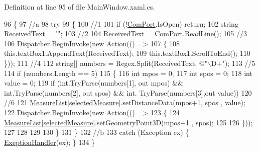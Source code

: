 Definition at line 95 of file Main\+Window.\+xaml.\+cs.


\begin{DoxyCode}
96         \{
97             \textcolor{comment}{//a}
98             \textcolor{keywordflow}{try}
99             \{
100                 \textcolor{comment}{//1}
101                 \textcolor{keywordflow}{if} (!\hyperlink{class_l_i_d_a_r___controller_1_1_main_window_ae8b01d789601ddbc234ede8a0b43eb7b}{ComPort}.IsOpen) \textcolor{keywordflow}{return};
102                 \textcolor{keywordtype}{string} ReceivedText = \textcolor{stringliteral}{""};
103                 \textcolor{comment}{//2}
104                 ReceivedText = \hyperlink{class_l_i_d_a_r___controller_1_1_main_window_ae8b01d789601ddbc234ede8a0b43eb7b}{ComPort}.ReadLine();
105                 \textcolor{comment}{//3}
106                 Dispatcher.BeginInvoke(\textcolor{keyword}{new} Action(() =>
107                 \{
108                     this.textBox1.AppendText(ReceivedText);
109                     this.textBox1.ScrollToEnd();
110                 \}));
111                 \textcolor{comment}{//4}
112                 \textcolor{keywordtype}{string}[] numbers = Regex.Split(ReceivedText, \textcolor{stringliteral}{@"\(\backslash\)D+"});
113                 \textcolor{comment}{//5}
114                 \textcolor{keywordflow}{if} (numbers.Length == 5)
115                 \{
116                     \textcolor{keywordtype}{int} mpos = 0;
117                     \textcolor{keywordtype}{int} spos = 0;
118                     \textcolor{keywordtype}{int} value = 0;
119                     \textcolor{keywordflow}{if} (\textcolor{keywordtype}{int}.TryParse(numbers[1], out mpos) && \textcolor{keywordtype}{int}.TryParse(numbers[2], out spos) && \textcolor{keywordtype}{int}.
      TryParse(numbers[3],out value))
120                         \textcolor{comment}{//6}
121                         \hyperlink{class_l_i_d_a_r___controller_1_1_main_window_add7555b1a79fa1c17cd18dcf98859b9c}{MeasureList}[\hyperlink{class_l_i_d_a_r___controller_1_1_main_window_a01f677b33ad15d2f0cdf8df1c64cd0e2}{selectedMeasure}].setDistanceData(mpos+1, spos
      , value);
122                     Dispatcher.BeginInvoke(\textcolor{keyword}{new} Action(() =>
123                     \{
124                         \hyperlink{class_l_i_d_a_r___controller_1_1_main_window_add7555b1a79fa1c17cd18dcf98859b9c}{MeasureList}[\hyperlink{class_l_i_d_a_r___controller_1_1_main_window_a01f677b33ad15d2f0cdf8df1c64cd0e2}{selectedMeasure}].setGeometryPoint3D(mpos+1 , 
      spos);
125 
126                     \}));
127 
128 
129 
130                 \}
131             \}
132             \textcolor{comment}{//b}
133             \textcolor{keywordflow}{catch} (Exception ex) \{ \hyperlink{class_l_i_d_a_r___controller_1_1_main_window_a1c0ad2dd56b20d3fdb928b918c0bc153}{ExeptionHandler}(ex); \}
134         \}
\end{DoxyCode}
